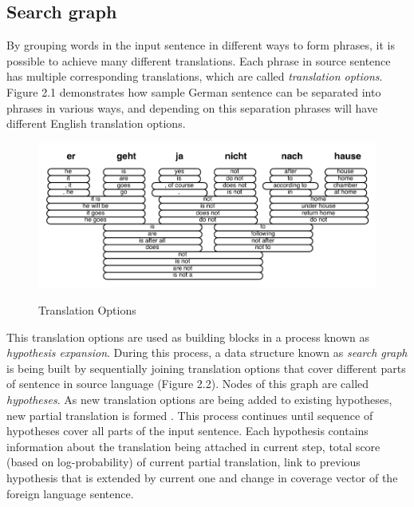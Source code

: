 \subsection{Search graph}

By grouping words in the input sentence in different ways to form phrases, it is possible to achieve many different translations. Each phrase in source sentence has multiple corresponding translations, which are called \textit{translation options}. Figure 2.1 demonstrates how sample German sentence can be separated into phrases in various ways, and depending on this separation phrases will have different English translation options. 

\begin{figure}
 \centering 
 \includegraphics{g/translation-options.pdf}
 \caption{Translation Options}
 \caption*{\textit{\cite{Koehn2009a}}}
\end{figure}

This translation options are used as building blocks in a process known as \textit{hypothesis expansion}. During this process, a data structure known as \textit{search graph} is being built by sequentially joining translation options that cover different parts of sentence in source language (Figure 2.2). Nodes of this graph are called \textit{hypotheses}. As new translation options are being added to existing hypotheses, new partial translation is formed \cite{Koehn2009a}. This process continues until sequence of hypotheses cover all parts of the input sentence. Each hypothesis contains information about the translation being attached in current step, total score (based on log-probability) of current partial translation, link to previous hypothesis that is extended by current one and change in coverage vector of the foreign language sentence.


